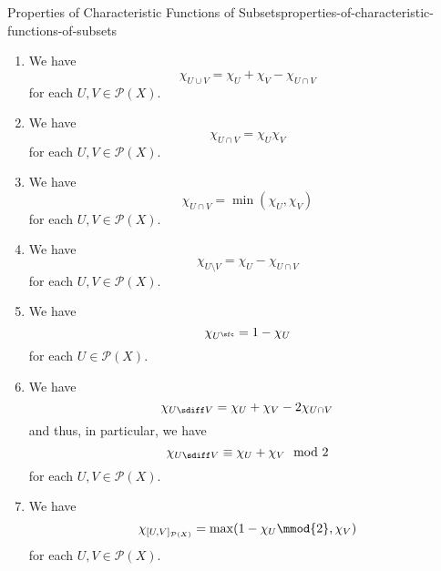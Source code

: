 \begin{proposition}{Properties of Characteristic Functions of Subsets}{properties-of-characteristic-functions-of-subsets}
\begin{enumerate}
\[                =%
                \max(\chi_{U},\chi_{V})%
            \]%
            for each $U,V\in\mathcal{P}(X)$.
        \item\label{properties-of-characteristic-functions-of-subsets-interaction-with-unions-2}We have
            \[
                \chi_{U\cup V}%
                =%
                \chi_{U}+\chi_{V}-\chi_{U\cap V}%
            \]%
            for each $U,V\in\mathcal{P}(X)$.
        \item\label{properties-of-characteristic-functions-of-subsets-interaction-with-intersections-1}We have
            \[
                \chi_{U\cap V}%
                =%
                \chi_{U}\chi_{V}%
            \]%
            for each $U,V\in\mathcal{P}(X)$.
        \item\label{properties-of-characteristic-functions-of-subsets-interaction-with-intersections-2}We have
            \[
                \chi_{U\cap V}%
                =%
                \min(\chi_{U},\chi_{V})%
            \]%
            for each $U,V\in\mathcal{P}(X)$.
        \item\label{properties-of-characteristic-functions-of-subsets-interaction-with-differences}We have
            \[
                \chi_{U\setminus V}%
                =%
                \chi_{U}%
                -%
                \chi_{U\cap V}%
            \]%
            for each $U,V\in\mathcal{P}(X)$.
        \item\label{properties-of-characteristic-functions-of-subsets-interaction-with-complements}We have
            \[
                \chi_{U^{\sfc}}%
                =%
                1-\chi_{U}%
            \]%
            for each $U\in\mathcal{P}(X)$.
        \item\label{properties-of-characteristic-functions-of-subsets-interaction-with-symmetric-differences}We have
            \[
                \chi_{U\sdiff V}%
                =%
                \chi_{U}%
                +%
                \chi_{V}%
                -%
                2\chi_{U\cap V}%
            \]%
            and thus, in particular, we have
            \[
                \chi_{U\sdiff V}%
                \equiv%
                \chi_{U}+\chi_{V}%
                \mod{2}%
            \]%
            for each $U,V\in\mathcal{P}(X)$.
        \item\label{properties-of-characteristic-functions-of-subsets-interaction-with-internal-homs}We have
            \[
                \chi_{[U,V]_{\mathcal{P}(X)}}%
                =%
                \max(1-\chi_{U}\mmod{2},\chi_{V})
            \]%
            for each $U,V\in\mathcal{P}(X)$.
    \end{enumerate}
\end{proposition}
